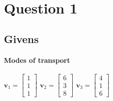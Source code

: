 \documentclass{article}
\begin{document}
    \section{Question 1}
        \subsection{Givens}
            \paragraph{Modes of transport}
                $\mathbf{v}_1=\begin{bmatrix}1\\1\\1\end{bmatrix}$
                $\mathbf{v}_2=\begin{bmatrix}6\\3\\8\end{bmatrix}$
                $\mathbf{v}_3=\begin{bmatrix}4\\1\\6\end{bmatrix}$
\end{document}
